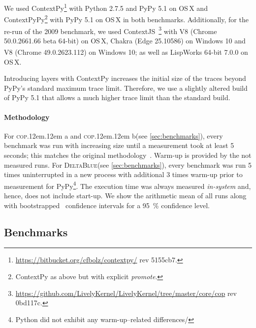 \documentclass[preprint,english,10pt,nonatbib]{sigplanconf}
\DeclareRobustCommand*\copa{\textsc{cop}\kern .12em\oldstylenums{09}\kern .12em a\xspace}
\DeclareRobustCommand*\copb{\textsc{cop}\kern .12em\oldstylenums{09}\kern .12em b\xspace}
\DeclareRobustCommand*\deltablue{\textsc{DeltaBlue}\xspace}
\begin{document}
We used ContextPy\footnote{{\smaller\url{https://bitbucket.org/cfbolz/contextpy/}}
  rev 5155cb7.} with Python 2.7.5 and PyPy 5.1 on OS\,X and
ContextPyPy\footnote{ContextPy as above but with explicit \emph{promote}.} with
PyPy 5.1 on OS\,X in both benchmarks. Additionally, for the re-run of the 2009
benchmark, we used
ContextJS~\cite{lincke+:2011:open-implementation}\footnote{{\smaller\url{https://github.com/LivelyKernel/LivelyKernel/tree/master/core/cop}}
  rev 0bd117c.} with V8 (Chrome 50.0.2661.66 beta 64-bit) on OS\,X, Chakra
(Edge 25.10586) on Windows 10 and V8 (Chrome 49.0.2623.112) on Windows 10; as
well as LispWorks\textsuperscript{\textregistered} 64-bit 7.0.0 on OS\,X.

Introducing layers with ContextPy increases the initial size of the traces
beyond PyPy's standard maximum trace limit. Therefore, we use a slightly
altered build of PyPy 5.1 that allows a much higher trace limit than the
standard build.


\paragraph{Methodology} 
For \copa and \copb (see \autoref{sec:benchmarks}), every benchmark was run with increasing size until a
measurement took at least 5 seconds; this matches the original
methodology~\cite{appeltauer+:2009:comparison-context-oriented}. Warm-up is
provided by the not measured runs. 
For \deltablue (see \autoref{sec:benchmarks}), every benchmark was run 5 times
uninterrupted in a new process with additional 3 times warm-up prior to
measurement for PyPy\footnote{Python did not exhibit any warm-up--related
  differences/}. The execution time was always measured \emph{in-system} and,
hence, does not include start-up. We show the arithmetic mean of all runs along
with bootstrapped~\cite{davison+:1997:confidence-intervals} confidence
intervals for a \SI{95}{\percent} confidence level.




\subsection{Benchmarks}
\label{sec:benchmarks}
\end{document}
